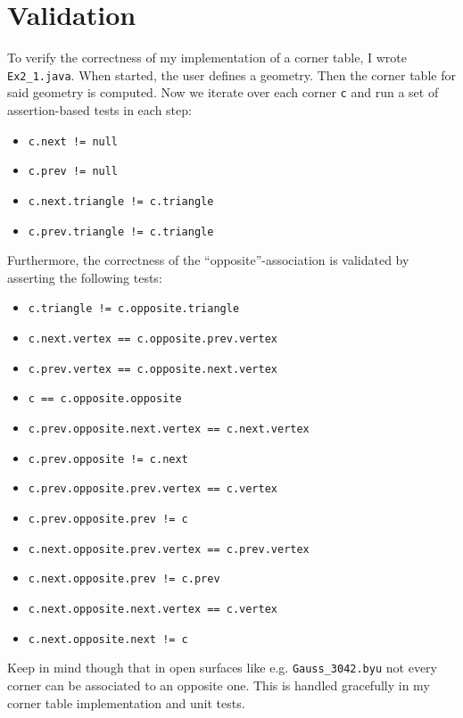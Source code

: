 \documentclass[a4paper,10pt,notitlepage]{scrreprt}
\begin{document}
\section{Validation}

To verify the correctness of my implementation of a corner table, I wrote
\texttt{Ex2\_1.java}. When started, the user defines a geometry. Then the corner
table for said geometry is computed. Now we iterate over each corner \texttt{c}
and run a set of assertion-based tests in each step:

\begin{itemize}
 \item \texttt{c.next != null}
 \item \texttt{c.prev != null}
 \item \texttt{c.next.triangle != c.triangle}
 \item \texttt{c.prev.triangle != c.triangle}
\end{itemize}

Furthermore, the correctness of the ``opposite''-association is validated by
asserting the following tests:

\begin{itemize}
 \item \texttt{c.triangle != c.opposite.triangle}
 \item \texttt{c.next.vertex == c.opposite.prev.vertex}
 \item \texttt{c.prev.vertex == c.opposite.next.vertex}
 \item \texttt{c == c.opposite.opposite}
 \item \texttt{c.prev.opposite.next.vertex == c.next.vertex}
 \item \texttt{c.prev.opposite != c.next}
 \item \texttt{c.prev.opposite.prev.vertex == c.vertex}
 \item \texttt{c.prev.opposite.prev != c}
 \item \texttt{c.next.opposite.prev.vertex == c.prev.vertex}
 \item \texttt{c.next.opposite.prev != c.prev}
 \item \texttt{c.next.opposite.next.vertex == c.vertex}
 \item \texttt{c.next.opposite.next != c}
\end{itemize}

Keep in mind though that in open surfaces like e.g. \texttt{Gauss\_3042.byu} not
every corner can be associated to an opposite one. This is handled gracefully in
my corner table implementation and unit tests.
\end{document}

